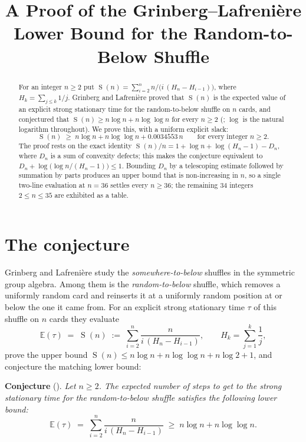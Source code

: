 \documentclass[11pt]{amsart}
\title[The Grinberg--Lafreni\`ere lower bound]
{A Proof of the Grinberg--Lafreni\`ere Lower Bound for the Random-to-Below Shuffle}
\date{}
\DeclareMathOperator{\Sfun}{S}
\newcommand{\Hn}{H}
\begin{document}
\begin{abstract}
For an integer $n\ge2$ put
$\Sfun(n)=\sum_{i=2}^{n} n\bigl/\bigl(i\,(H_n-H_{i-1})\bigr)$,
where $H_k=\sum_{j\le k}1/j$. Grinberg and Lafreni\`ere proved that $\Sfun(n)$ is the
expected value of an explicit strong stationary time for the random-to-below shuffle on
$n$ cards, and conjectured that
$\Sfun(n)\ge n\log n+n\log\log n$ for every $n\ge2$
(\cite[Conjecture~15.8]{GL}; $\log$ is the natural logarithm throughout). We prove this,
with a uniform explicit slack:
\[
 \Sfun(n)\;\ge\;n\log n+n\log\log n+0.0034553\,n
 \qquad\text{for every integer }n\ge2 .
\]
The proof rests on the exact identity
$\Sfun(n)/n=1+\log n+\log(H_n-1)-D_n$, where $D_n$ is a sum of convexity defects; this
makes the conjecture equivalent to $D_n+\log\bigl(\log n/(H_n-1)\bigr)\le1$. Bounding
$D_n$ by a telescoping estimate followed by summation by parts produces an upper bound
that is non-increasing in $n$, so a single two-line evaluation at $n=36$ settles every
$n\ge36$; the remaining $34$ integers $2\le n\le35$ are exhibited as a table.
\end{abstract}

\maketitle

\section{The conjecture}

Grinberg and Lafreni\`ere \cite{GL} study the \emph{somewhere-to-below} shuffles in the
symmetric group algebra. Among them is the \emph{random-to-below} shuffle, which removes a
uniformly random card and reinserts it at a uniformly random position at or below the one
it came from. For an explicit strong stationary time $\tau$ of this shuffle on $n$ cards
they evaluate
\begin{equation}\label{eq:S}
 \mathbb E(\tau)\;=\;\Sfun(n)\;:=\;\sum_{i=2}^{n}\frac{n}{i\,(\Hn_n-\Hn_{i-1})},
 \qquad \Hn_k=\sum_{j=1}^{k}\frac1j ,
\end{equation}
prove the upper bound $\Sfun(n)\le n\log n+n\log\log n+n\log2+1$, and conjecture the
matching lower bound:

\medskip
\noindent\textbf{Conjecture} (\cite[Conjecture~15.8]{GL}).
\emph{Let $n\ge2$. The expected number of steps to get to the strong stationary time for
the random-to-below shuffle satisfies the following lower bound:}
\[
 \mathbb E(\tau)\;=\;\sum_{i=2}^{n}\frac{n}{i\,(\Hn_n-\Hn_{i-1})}
 \;\ge\;n\log n+n\log\log n .
\]
\end{document}
